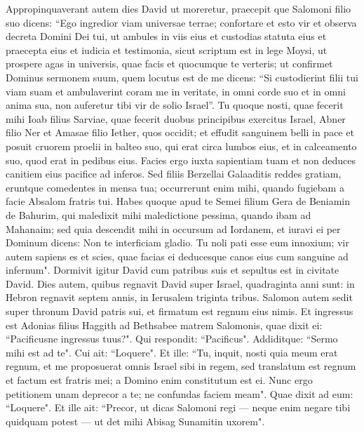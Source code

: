 \begin{biblechapter}  
\verse Appropinquaverant autem dies David ut moreretur, praecepit que Salomoni filio suo dicens: 
\verse “Ego ingredior viam universae terrae; confortare et esto vir 
\verse et observa decreta Domini Dei tui, ut ambules in viis eius et custodias statuta eius et praecepta eius et iudicia et testimonia, sicut scriptum est in lege Moysi, ut prospere agas in universis, quae facis et quocumque te verteris; 
\verse ut confirmet Dominus sermonem suum, quem locutus est de me dicens: “Si custodierint filii tui viam suam et ambulaverint coram me in veritate, in omni corde suo et in omni anima sua, non auferetur tibi vir de solio Israel”. 
\verse Tu quoque nosti, quae fecerit mihi Ioab filius Sarviae, quae fecerit duobus principibus exercitus Israel, Abner filio Ner et Amasae filio Iether, quos occidit; et effudit sanguinem belli in pace et posuit cruorem proelii in balteo suo, qui erat circa lumbos eius, et in calceamento suo, quod erat in pedibus eius. 
\verse Facies ergo iuxta sapientiam tuam et non deduces canitiem eius pacifice ad inferos. 
\verse Sed filiis Berzellai Galaaditis reddes gratiam, eruntque comedentes in mensa tua; occurrerunt enim mihi, quando fugiebam a facie Absalom fratris tui. 
\verse Habes quoque apud te Semei filium Gera de Beniamin de Bahurim, qui maledixit mihi maledictione pessima, quando ibam ad Mahanaim; sed quia descendit mihi in occursum ad Iordanem, et iuravi ei per Dominum dicens: Non te interficiam gladio. 
\verse Tu noli pati esse eum innoxium; vir autem sapiens es et scies, quae facias ei deducesque canos eius cum sanguine ad infernum". 
\verse Dormivit igitur David cum patribus suis et sepultus est in civitate David.  
\verse Dies autem, quibus regnavit David super Israel, quadraginta anni sunt: in Hebron regnavit septem annis, in Ierusalem triginta tribus. 
\verse Salomon autem sedit super thronum David patris sui, et firmatum est regnum eius nimis. 
\verse Et ingressus est Adonias filius Haggith ad Bethsabee matrem Salomonis, quae dixit ei: “Pacificusne ingressus tuus?". Qui respondit: “Pacificus". 
\verse Addiditque: “Sermo mihi est ad te". Cui ait: “Loquere". Et ille: 
\verse “Tu, inquit, nosti quia meum erat regnum, et me proposuerat omnis Israel sibi in regem, sed translatum est regnum et factum est fratris mei; a Domino enim constitutum est ei. 
\verse Nunc ergo petitionem unam deprecor a te; ne confundas faciem meam". Quae dixit ad eum: “Loquere". 
\verse Et ille ait: “Precor, ut dicas Salomoni regi — neque enim negare tibi quidquam potest — ut det mihi Abisag Sunamitin uxorem". 

\end{biblechapter}
